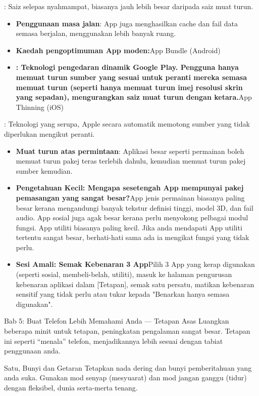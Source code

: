 
: Saiz selepas nyahmampat, biasanya jauh lebih besar daripada saiz muat turun.

\begin{itemize}
  \item \textbf{Penggunaan masa jalan}: App juga menghasilkan cache dan fail data semasa berjalan, menggunakan lebih banyak ruang.
  \item \textbf{Kaedah pengoptimuman App moden:}App Bundle (Android)
  \item \textbf{: Teknologi pengedaran dinamik Google Play. Pengguna hanya memuat turun sumber yang sesuai untuk peranti mereka semasa memuat turun (seperti hanya memuat turun imej resolusi skrin yang sepadan), mengurangkan saiz muat turun dengan ketara.}App Thinning (iOS)
\end{itemize}

: Teknologi yang serupa, Apple secara automatik memotong sumber yang tidak diperlukan mengikut peranti.

\begin{itemize}
  \item \textbf{Muat turun atas permintaan}: Aplikasi besar seperti permainan boleh memuat turun pakej teras terlebih dahulu, kemudian memuat turun pakej sumber kemudian.
  \item \textbf{Pengetahuan Kecil: Mengapa sesetengah App mempunyai pakej pemasangan yang sangat besar?}App jenis permainan biasanya paling besar kerana mengandungi banyak tekstur definisi tinggi, model 3D, dan fail audio. App sosial juga agak besar kerana perlu menyokong pelbagai modul fungsi. App utiliti biasanya paling kecil. Jika anda mendapati App utiliti tertentu sangat besar, berhati-hati sama ada ia mengikat fungsi yang tidak perlu.
  \item \textbf{Sesi Amali: Semak Kebenaran 3 App}Pilih 3 App yang kerap digunakan (seperti sosial, membeli-belah, utiliti), masuk ke halaman pengurusan kebenaran aplikasi dalam [Tetapan], semak satu persatu, matikan kebenaran sensitif yang tidak perlu atau tukar kepada "Benarkan hanya semasa digunakan".
\end{itemize}

\begin{tcbinfo}{Bab 5: Buat Telefon Lebih Memahami Anda — Tetapan Asas}
Luangkan beberapa minit untuk tetapan, peningkatan pengalaman sangat besar. Tetapan ini seperti “menala” telefon, menjadikannya lebih sesuai dengan tabiat penggunaan anda.

\end{tcbinfo}

\begin{tcbpractice}{Satu, Bunyi dan Getaran}
Tetapkan nada dering dan bunyi pemberitahuan yang anda suka. Gunakan mod senyap (mesyuarat) dan mod jangan ganggu (tidur) dengan fleksibel, dunia serta-merta tenang.

\end{tcbpractice}
